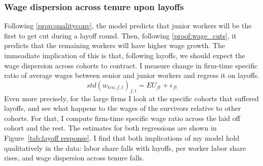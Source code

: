 \subsubsection*{Wage dispersion across tenure upon layoffs} %
Following \ref{prop:qualityconv}, the model predicts that junior workers will be the first to get cut during a layoff round. Then, following \ref{proof:wage_cuts}, it predicts that the remaining workers will have higher wage growth. The immeadiate implication of this is that, following layoffs, we should expect the wage dispersion across cohorts to contract. I measure change in firm-time specific ratio of average wages between senior and junior workers and regress it on layoffs.
\[ std(w_{ten,f,t})_{f,t} = EU_{ft} + \epsilon_{ft} \]
Even more precisely, for the large firms I look at the specific cohorts that suffered layoffs, and see what happens to the wages of the survivors relative to other cohorts. For that, I compute firm-time specific wage ratio across the laid off cohort and the rest.
The estimates for both regressions are shown in Figure~\ref{tab:layoff response}. I find that both implications of my model hold qualitatively in the data: labor share falls with layoffs, per worker labor share rises, and wage dispersion across tenure falls.

